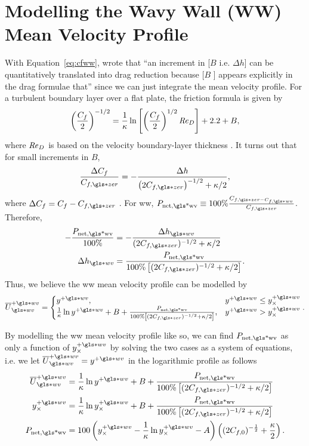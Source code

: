 \section{Modelling the Wavy Wall (WW) Mean Velocity Profile}
With Equation~\eqref{eq:cfww}, \textcite{luchini1996} wrote that ``an increment in [$B$ i.e.  $\Delta h$] can be quantitatively translated into drag reduction because [$B$ ] appears explicitly in the drag formulae that'' since we can just integrate the mean velocity profile. For a turbulent boundary layer over a flat plate, the friction formula is given by
\begin{equation}
	\left( \frac{C_f}{2} \right) ^{-1 /2} = \frac{1}{\kappa}\ln \left[ \left( \frac{C_f}{2} \right) ^{1 /2 } \mbox{\textit{Re}}_D \right] + 2.2 + B
,\end{equation}
where $\mbox{\textit{Re}}_D $ is based on the velocity boundary-layer thickness \cite{white1991}. It turns out that for small increments in $B$,
 \begin{equation}
	 \frac{\Delta C_f}{C_{f,\gls*{zer}}}=-\frac{\Delta h}{\left(2C_{f,\gls*{zer}}\right)^{-1 /2} +\kappa /2}\label{eq:luchini}
,\end{equation}
where $\Delta C_f=C_f-C_{f,\gls*{zer}}$ \cite{luchini1996}. For \gls*{ww}, $P_\text{net,\gls*{wv}} \equiv100\% \frac{C_{f,\gls*{zer}-C_{f,\gls*{wv}}}}{C_{f,\gls*{zer}}}$. Therefore,
\begin{align}
	-\frac{P_\text{net,\gls*{wv}}}{100\%} &=-\frac{\Delta h\ww}{(2C_{f,\gls*{zer}})^{-1 / 2}+\kappa / 2}\\
	\Delta h\ww &= \frac{P_\text{net,\gls*{wv}}}{100\%\left[(2C_{f,\gls*{zer}})^{-1 / 2}+\kappa / 2\right]}
.\end{align}
Thus, we believe the \gls*{ww} mean velocity profile can be modelled by
\begin{equation}
	\overline{U}\ww\pw =
	\begin{cases}
		y\pw, & y\pw\leq y_{\times}\pw\\
		\frac{1}{\kappa}\ln y\pw +B +\frac{P_\text{net,\gls*{wv}}}{100\%\left[(2C_{f,\gls*{zer}})^{-1 / 2}+\kappa / 2\right]}, & y\pw>y_{\times}\pw
	\end{cases}
.\end{equation}

By modelling the \gls*{ww} mean velocity profile like so, we can find $P_\text{net,\gls*{wv}} $ as only a function of $y_{\times}\pw$ by solving the two cases as a system of equations, i.e. we let $\overline{U}\ww\pw=y\pw$ in the logarithmic profile as follows
\begin{align}
	\overline{U}\pw\ww &=\frac{1}{\kappa}\ln y\pw +B +\frac{P_\text{net,\gls*{wv}}}{100\%\left[(2C_{f,\gls*{zer}})^{-1 / 2}+\kappa / 2\right]} \\
	y_\times\pw &=\frac{1}{\kappa}\ln y_\times\pw +B +\frac{P_\text{net,\gls*{wv}}}{100\%\left[(2C_{f,\gls*{zer}})^{-1 / 2}+\kappa / 2\right]} \\
	P_\text{net,\gls*{wv}} &=100\left(  y_{\times}\pw - \frac{1}{\kappa}\ln y_{\times}\pw - A \right) \left( (2C_{f,0})^{-\frac{1}{2}} +\frac{\kappa}{2} \right) 
.\end{align}

